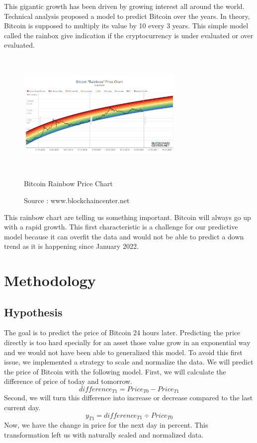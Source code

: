 \documentclass[conference]{IEEEtran}
\begin{document}
This gigantic growth has been driven by growing interest all around the world. Technical analysis proposed a model to predict Bitcoin over the years. In theory, Bitcoin is supposed to multiply its value by 10 every 3 years. This simple model called the rainbox give indication  if the cryptocurrency is under evaluated or over evaluated. 

\begin{figure}[H]
	\includegraphics[width=8cm, height=6cm]{BTC_rainbow}
	\label{fig}
	\caption{Bitcoin Rainbow Price Chart}
    \caption*{Source : www.blockchaincenter.net}
\end{figure}

This rainbow chart are telling us something important. Bitcoin will always go up with a rapid growth. This first characteristic is a challenge for our predictive model because it can overfit the data and would not be able to predict a down trend as it is happening since January 2022. 


\section{Methodology}

\subsection{Hypothesis}\label{AA}

The goal is to predict the price of Bitcoin 24 hours later. Predicting the price directly is too hard specially for an asset those value grow in an exponential way and we would not have been able to generalized this model. To avoid this first issue, we implemented a strategy to scale and normalize the data.\newline
\newline
We will predict the price of Bitcoin with the following model. 
First, we will calculate the difference of price of today and tomorrow.
\begin{equation}
difference_{T1} = Price_{T0} - Price_{T1}
\end{equation}
Second, we will turn this difference  into increase or decrease compared to the last current day.
\begin{equation}
y_{T1} = difference_{T1} \div Price_{T0}
\end{equation}
Now, we have the change in price for the next day in percent. This transformation left us with naturally scaled and normalized data.  
\end{document}
